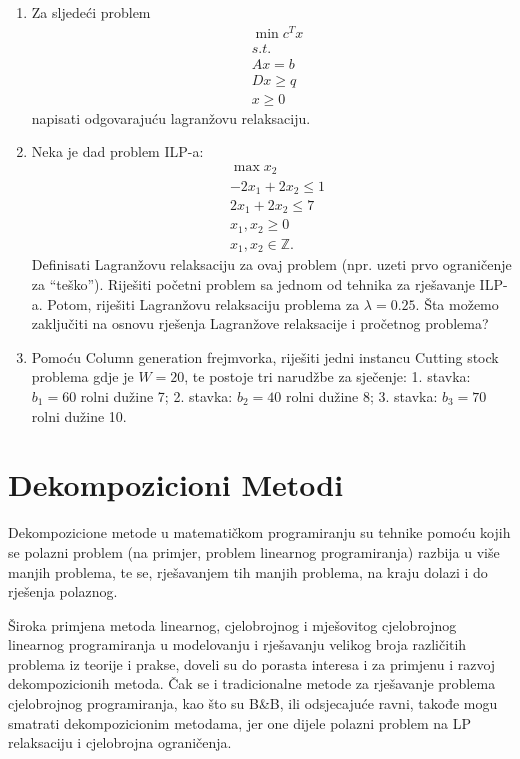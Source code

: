 \documentclass[a4paper, utf8, 11pt, colorlinks]{book}
\begin{document}
\begin{enumerate}
\item  Za sljedeći problem 
\begin{align*}
	&\min c^T x \\
	&s.t. \\
	& Ax = b \\
	& D x \geq q \\
	& x \geq 0
\end{align*}
napisati odgovarajuću lagranžovu relaksaciju. 
\item %
Neka je dad problem ILP-a:
\begin{align*}
	&\max x_2 \\
	& -2x_1 + 2x_2 \leq 1 \\
	& 2 x_1 + 2 x_2 \leq 7 \\
	& x_1, x_2 \geq 0 \\
	& x_1, x_2 \in \mathbb{Z}.
\end{align*}
Definisati Lagranžovu relaksaciju za ovaj problem (npr. uzeti prvo ograničenje za ``teško''). Riješiti početni problem sa jednom od tehnika za rješavanje ILP-a. Potom, riješiti Lagranžovu relaksaciju problema za $\lambda=0.25$. Šta možemo zaključiti na osnovu rješenja Lagranžove relaksacije i pročetnog problema? 
\item   Pomoću Column generation frejmvorka, riješiti jedni instancu Cutting stock problema gdje je  
$W = 20$, te postoje tri narudžbe za sječenje: 1. stavka: $b_1=60$ rolni dužine 7; 2. stavka: $b_2=40$ rolni dužine 8; 3. stavka: $b_3=70$ rolni dužine 10. 

 \end{enumerate}
 
 \newpage
 
 \chapter{Dekompozicioni Metodi}
 
Dekompozicione metode u matematičkom programiranju su tehnike pomoću kojih se polazni problem (na primjer, problem linearnog programiranja) razbija u više manjih problema, te se, rješavanjem tih manjih problema, na kraju dolazi i do rješenja polaznog.

Široka primjena metoda linearnog, cjelobrojnog i mješovitog cjelobrojnog linearnog programiranja u modelovanju i rješavanju velikog broja različitih problema iz teorije i prakse, doveli su do porasta interesa i za primjenu i razvoj dekompozicionih metoda. Čak se i tradicionalne metode za rješavanje problema cjelobrojnog programiranja, kao što su B\&B, ili odsjecajuće ravni, takođe   mogu smatrati dekompozicionim metodama, jer one dijele polazni problem na LP relaksaciju i cjelobrojna ograničenja.
\end{document}
